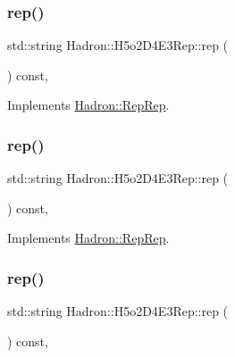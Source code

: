 \subsubsection{\texorpdfstring{rep()}{rep()}\hspace{0.1cm}{\footnotesize\ttfamily [1/3]}}
{\footnotesize\ttfamily std\+::string Hadron\+::\+H5o2\+D4\+E3\+Rep\+::rep (\begin{DoxyParamCaption}{ }\end{DoxyParamCaption}) const\hspace{0.3cm}{\ttfamily [inline]}, {\ttfamily [virtual]}}



Implements \mbox{\hyperlink{structHadron_1_1RepRep_ab3213025f6de249f7095892109575fde}{Hadron\+::\+Rep\+Rep}}.

\mbox{\label{structHadron_1_1H5o2D4E3Rep_ab2c75db69668bb5a4d127992c3441ea4}} 
\subsubsection{\texorpdfstring{rep()}{rep()}\hspace{0.1cm}{\footnotesize\ttfamily [2/3]}}
{\footnotesize\ttfamily std\+::string Hadron\+::\+H5o2\+D4\+E3\+Rep\+::rep (\begin{DoxyParamCaption}{ }\end{DoxyParamCaption}) const\hspace{0.3cm}{\ttfamily [inline]}, {\ttfamily [virtual]}}



Implements \mbox{\hyperlink{structHadron_1_1RepRep_ab3213025f6de249f7095892109575fde}{Hadron\+::\+Rep\+Rep}}.

\mbox{\label{structHadron_1_1H5o2D4E3Rep_ab2c75db69668bb5a4d127992c3441ea4}} 
\subsubsection{\texorpdfstring{rep()}{rep()}\hspace{0.1cm}{\footnotesize\ttfamily [3/3]}}
{\footnotesize\ttfamily std\+::string Hadron\+::\+H5o2\+D4\+E3\+Rep\+::rep (\begin{DoxyParamCaption}{ }\end{DoxyParamCaption}) const\hspace{0.3cm}{\ttfamily [inline]}, {\ttfamily [virtual]}}



